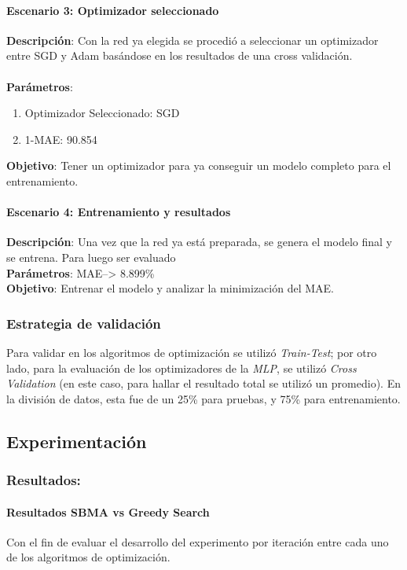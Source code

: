 \paragraph{Escenario 3: Optimizador seleccionado}
\textbf{Descripción}: Con la red ya elegida se procedió a seleccionar un optimizador entre SGD y Adam basándose en los resultados de una cross validación.\\\\
\textbf{Parámetros}:
\begin{enumerate}
    \item Optimizador Seleccionado: SGD
    \item 1-MAE: 90.854       
\end{enumerate}
\textbf{Objetivo}: Tener un optimizador para ya conseguir un modelo completo para el entrenamiento.\\

\paragraph{Escenario 4: Entrenamiento y resultados}
\textbf{Descripción}: Una vez que la red ya está preparada, se genera el modelo final y se entrena. Para luego ser evaluado\\
\textbf{Parámetros}: MAE--> 8.899\%\\
\textbf{Objetivo}: Entrenar el modelo y analizar la minimización del MAE.\\

\subsubsection{Estrategia de validación}

Para validar en los algoritmos de optimización se utilizó \textit{Train-Test}; por otro lado, para la evaluación de los optimizadores de la \textit{MLP}, se utilizó \textit{Cross Validation} (en este caso, para hallar el resultado total se utilizó un promedio). En la división de datos, esta fue de un 25\% para pruebas, y 75\% para entrenamiento.

\subsection{Experimentación}
\subsubsection{Resultados:}
\paragraph{Resultados SBMA vs Greedy Search}
Con el fin de evaluar el desarrollo del experimento por iteración entre cada uno de los algoritmos de optimización.

